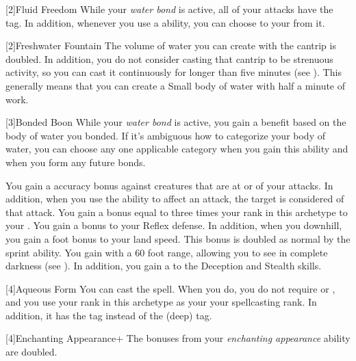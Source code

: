     [2]{Fluid Freedom} While your \textit{water bond} is active, all of your \magical attacks have the \atWater tag.
    In addition, whenever you use a \magical \atWater ability, you can choose to  your  from it.

    [2]{Freshwater Fountain} The volume of water you can create with the  cantrip is doubled.
    In addition, you do not consider casting that cantrip to be strenuous activity, so you can cast it continuously for longer than five minutes (see ).
    This generally means that you can create a Small body of water with half a minute of work.

    [3]{Bonded Boon} While your \textit{water bond} is active, you gain a benefit based on the body of water you bonded.
    If it's ambiguous how to categorize your body of water, you can choose any one applicable category when you gain this ability and when you form any future bonds.
    \begin{raggeditemize}
       You gain a  accuracy bonus against creatures that are at \unaware or \partiallyunaware of your attacks.
        In addition, when you use the  ability to affect an attack, the target is considered \partiallyunaware of that attack.
       You gain a bonus equal to three times your rank in this archetype to your .
       You gain a  bonus to your Reflex defense.
        In addition, when you  downhill, you gain a  foot bonus to your land speed.
        This bonus is doubled as normal by the sprint ability.
       You gain  with a 60 foot range, allowing you to see in complete darkness (see ).
        In addition, you gain a   to the Deception and Stealth skills.
    \end{raggeditemize}

    [4]{Aqueous Form} You can cast the  spell.
      When you do, you do not require  or , and you use your rank in this archetype as your your spellcasting rank.
      In addition, it has the \atAttune tag instead of the \atAttune (deep) tag.

    [4]{Enchanting Appearance+} The bonuses from your \textit{enchanting appearance} ability are doubled.

